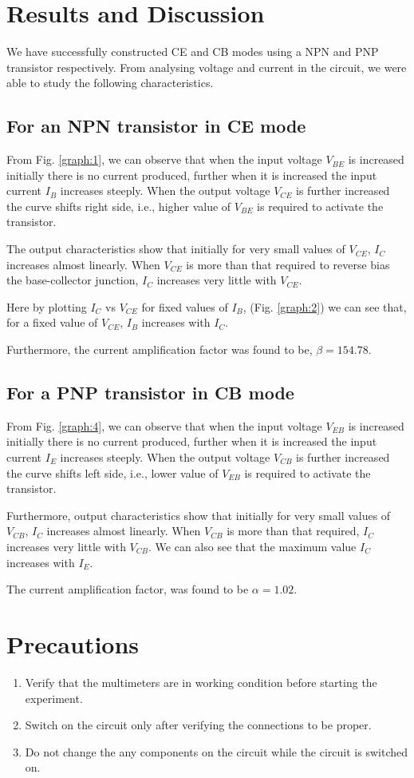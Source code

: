 \section{Results and Discussion}
We have successfully constructed CE and CB modes using a NPN and PNP transistor respectively. From analysing voltage and current in the circuit, we were able to study the following characteristics.

\subsection*{For an NPN transistor in CE mode}
From Fig. \ref{graph:1}, we can observe that when the input voltage $V_{BE}$ is increased initially there is no current produced, further when it is increased the input current $I_B$ increases steeply. When the output voltage $V_{CE}$ is further increased the curve shifts right side, i.e., higher value of $V_{BE}$ is required to activate the transistor.

The output characteristics show that initially for very small values of $V_{CE}$, $I_C$ increases almost linearly. When $V_{CE}$ is more than that required to reverse bias the base-collector junction, $I_C$ increases very little with $V_{CE}$. 
    
Here by plotting $I_C$ vs $V_{CE}$ for fixed values of $I_B$, (Fig. \ref{graph:2}) we can see that, for a fixed value of $V_{CE}$, $I_B$ increases with $I_C$.

Furthermore, the current amplification factor was found to be, $\beta=154.78$.

\subsection*{For a PNP transistor in CB mode}
From Fig. \ref{graph:4}, we can observe that when the input voltage $V_{EB}$ is increased initially there is no current produced, further when it is increased the input current $I_E$ increases steeply. When the output voltage $V_{CB}$ is further increased the curve shifts left side, i.e., lower value of $V_{EB}$ is required to activate the transistor.

Furthermore, output characteristics show that initially for very small values of $V_{CB}$, $I_C$ increases almost linearly. When $V_{CB}$ is more than that required, $I_C$ increases very little with $V_{CB}$. We can also see that the maximum value $I_C$ increases with $I_E$.

The current amplification factor, was found to be $\alpha=1.02$.

\section{Precautions}
\begin{enumerate}
    \item Verify that the multimeters are in working condition before starting the experiment.
    \item Switch on the circuit only after verifying the connections to be proper.
    \item Do not change the any components on the circuit while the circuit is switched on.
\end{enumerate}